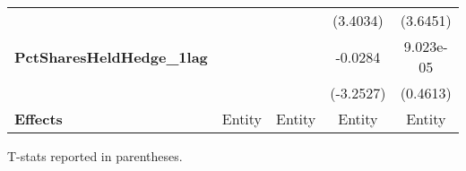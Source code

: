\begin{center}
\begin{tabular}{lcccc}
\textbf{ }                                 &                    &                               &            (3.4034)            &        (3.6451)        \\
\textbf{PctSharesHeldHedge\_1lag}          &                    &                               &            -0.0284             &       9.023e-05        \\
\textbf{ }                                 &                    &                               &           (-3.2527)            &        (0.4613)        \\
\midrule
\textbf{Effects}                           &       Entity       &             Entity            &             Entity             &         Entity         \\
\bottomrule
\end{tabular}
\end{center}
T-stats reported in parentheses.
